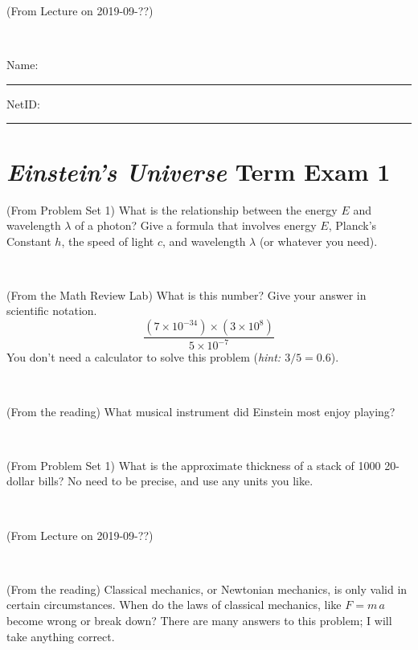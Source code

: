 \documentclass[12pt, letterpaper]{article}
\begin{document}
\begin{problem} (From Lecture on 2019-09-??)
\end{problem}


\vfill ~


\cleardoublepage



\noindent
Name: \rule[-1ex]{0.60\textwidth}{0.1pt}
NetID: \rule[-1ex]{0.20\textwidth}{0.1pt}

\section*{\textsl{Einstein's Universe} Term Exam 1}
\setcounter{problem}{1}


\begin{problem} (From Problem Set 1)
What is the relationship between the energy $E$ and wavelength
$\lambda$ of a photon? Give a formula that involves energy $E$,
Planck's Constant $h$, the speed of light $c$, and wavelength
$\lambda$ (or whatever you need).
\end{problem}

\vfill ~

\begin{problem} (From the Math Review Lab)
What is this number? Give your answer in scientific notation.
$$
\frac{(7\times10^{-34})\times(3\times10^8)}{5\times10^{-7}}
$$
You don't need a calculator to solve this problem (\textit{hint: $3/5=0.6$}).
\end{problem}


\vfill ~

\begin{problem} (From the reading)
What musical instrument did Einstein most enjoy playing?
\end{problem}


\vfill ~

\begin{problem} (From Problem Set 1)
What is the approximate thickness of a stack of 1000 20-dollar bills?
No need to be precise, and use any units you like.
\end{problem}


\vfill ~


\clearpage


\begin{problem} (From Lecture on 2019-09-??)
\end{problem}


\vfill ~

\begin{problem} (From the reading)
Classical mechanics, or Newtonian mechanics, is only valid in certain
circumstances. When do the laws of classical mechanics, like $F =
m\,a$ become wrong or break down? There are many answers to this
problem; I will take anything correct.
\end{problem}
\end{document}
